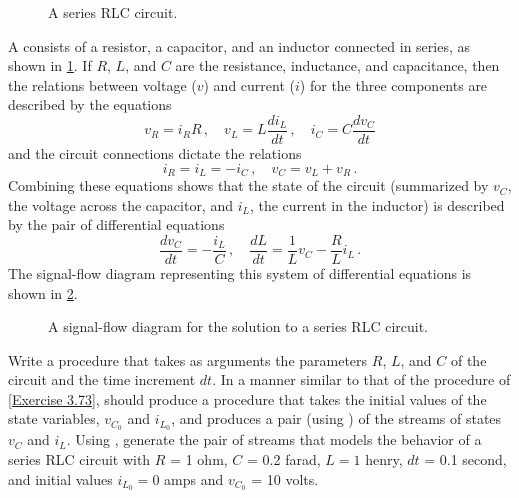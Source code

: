 \begin{figure}[tb]
	\centering
	
	\caption{
		A series RLC circuit.
	}
	\label{Figure 3.36}
\end{figure}



\begin{exercise}
	\label{Exercise 3.80}
	A  consists of a resistor, a capacitor, and an inductor connected in series, as shown in \cref{Figure 3.36}.
	If \( R \), \( L \), and \( C \) are the resistance, inductance, and capacitance, then the relations between voltage (\( v \)) and current (\( i \)) for the three components are described by the equations
	\[
		v_R = i_R R \,, \quad
		v_L = L \frac{d i_L}{d t} \,, \quad
		i_C = C \frac{d v_C}{d t}
	\]
	and the circuit connections dictate the relations
	\[
		i_R = i_L = -i_C \,, \quad
		v_C = v_L + v_R \,.
	\]
	Combining these equations shows that the state of the circuit (summarized by \( v_C \), the voltage across the capacitor, and \( i_L \), the current in the inductor) is described by the pair of differential equations
	\[
		\frac{d v_C}{d t} = - \frac{i_L}{C} \,,
		\quad
		\frac{d L}{d t} = \frac{1}{L} v_C - \frac{R}{L} i_L \,.
		\]
	The signal-flow diagram representing this system of differential equations is shown in \cref{Figure 3.37}.
\end{exercise}



\begin{figure}[tb]
	\centering
	
	\caption{
		A signal-flow diagram for the solution to a series RLC circuit.
	}
	\label{Figure 3.37}
\end{figure}



\begin{exercise}
	Write a procedure  that takes as arguments the parameters \( R \), \( L \), and \( C \) of the circuit and the time increment \( dt \).
	In a manner similar to that of the  procedure of \cref{Exercise 3.73},  should produce a procedure that takes the initial values of the state variables, \( v_{C_0} \) and \( i_{L_0} \), and produces a pair (using ) of the streams of states \( v_C \) and \( i_L \).
	Using , generate the pair of streams that models the behavior of a series RLC circuit with \( R \) = 1 ohm, \( C \) = 0.2 farad, \( L  = 1 \) henry, \( dt \) = 0.1 second, and initial values \( i_{L_0} = 0 \) amps and \( v_{C_0} \) = 10 volts.
\end{exercise}



